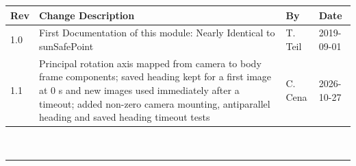 \documentclass[]{BasiliskReportMemo}
\begin{document}
\makeCover

%
%
\newpage
\pagestyle{empty}
{\renewcommand{\arraystretch}{2}
\noindent
\begin{longtable}{|p{0.5in}|p{3.5in}|p{1.07in}|p{0.9in}|}
\hline
{\bfseries Rev} & {\bfseries Change Description} & {\bfseries By}& {\bfseries Date} \\
\hline
1.0 & First Documentation of this module: Nearly Identical to sunSafePoint & T. Teil & 2019-09-01\\
\hline
1.1 & Principal rotation axis mapped from camera to body frame components; saved heading kept for a first image at 0 s and new images used immediately after a timeout; added non-zero camera mounting, antiparallel heading and saved heading timeout tests & C. Cena & 2026-10-27\\
\hline

\end{longtable}
}


\setcounter{page}{1}
\pagestyle{fancy}

\tableofcontents %
~\\ \hrule ~\\ %




















\end{document}
